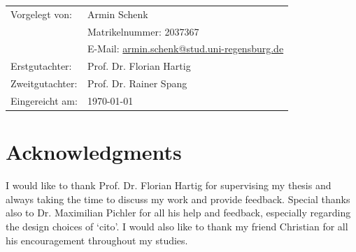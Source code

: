 \documentclass[12pt,twoside]{scrreport}
\newcommand{\pkg}[1]{`#1'}
\begin{document}
\begin{titlepage}
\begin{tabular}{ll}
Vorgelegt von: & Armin Schenk \\
& Matrikelnummer: 2037367 \\
& E-Mail: \url{armin.schenk@stud.uni-regensburg.de} \vspace{5mm}\\

Erstgutachter: & Prof. Dr. Florian Hartig\\
Zweitgutachter: & Prof. Dr. Rainer Spang \vspace{5mm}\\

Eingereicht am: & \today\\
\end{tabular}
\restoregeometry 
\end{titlepage}

\thispagestyle{empty}
\vspace*{\fill} %
\mbox{} %

\chapter*{Acknowledgments}
I would like to thank Prof. Dr. Florian Hartig for supervising my thesis and always taking the time to discuss my work and provide feedback. Special thanks also to Dr. Maximilian Pichler for all his help and feedback, especially regarding the design choices of \pkg{cito}. I would also like to thank my friend Christian for all his encouragement throughout my studies.

\newpage
\thispagestyle{empty}
\vspace*{\fill} %
\mbox{} %
\end{document}
